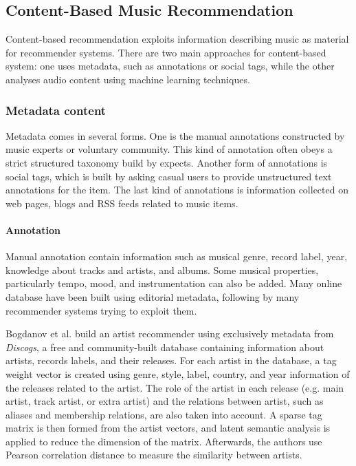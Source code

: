 \subsection{Content-Based Music Recommendation}

Content-based recommendation exploits information describing music as material for recommender systems. There are two main approaches for content-based system: one uses metadata, such as annotations or social tags, while the other analyses audio content using machine learning techniques.

\subsubsection{Metadata content}
Metadata comes in several forms. One is the manual annotations constructed by music experts or voluntary community. This kind of annotation often obeys a strict structured taxonomy build by expects. Another form of annotations is social tags, which is built by asking casual users to provide unstructured text annotations for the item. The last kind of annotations is information collected on web pages, blogs and RSS feeds related to music items.

\paragraph{Annotation} 
Manual annotation contain information such as musical genre, record label, year, knowledge about tracks and artists, and albums. Some musical properties, particularly tempo, mood, and instrumentation can also be added. Many online database have been built using editorial metadata, following by many recommender systems trying to exploit them. 

Bogdanov et al. \cite{bogdanov2012taking} build an artist recommender using exclusively metadata from \textit{Discogs}, a free and community-built database containing information about artists, records labels, and their releases. For each artist in the database, a tag weight vector is created using genre, style, label, country, and year information of the releases related to the artist. The role of the artist in each release (e.g. main artist, track artist, or extra artist) and the relations between artist, such as aliases and membership relations, are also taken into account. A sparse tag matrix is then formed from the artist vectors, and latent semantic analysis \cite{deerwester1990indexing} is applied to reduce the dimension of the matrix. Afterwards, the authors use Pearson correlation distance \cite{gibbons2011nonparametric} to measure the similarity between artists.

